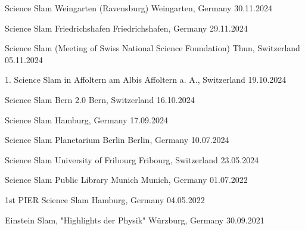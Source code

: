 \begin{cvhonors}

\cvhonor
{Science Slam Weingarten (Ravensburg)} %
{Weingarten, Germany} %
{} %
{30.11.2024} %

\cvhonor
{Science Slam Friedrichshafen} %
{Friedrichshafen, Germany} %
{} %
{29.11.2024} %

\cvhonor
{Science Slam (Meeting of Swiss National Science Foundation)} %
{Thun, Switzerland} %
{} %
{05.11.2024} %

\cvhonor
{1. Science Slam in Affoltern am Albis} %
{Affoltern a. A., Switzerland} %
{} %
{19.10.2024} %

\cvhonor
{Science Slam Bern 2.0} %
{Bern, Switzerland} %
{} %
{16.10.2024} %

\cvhonor
{Science Slam} %
{Hamburg, Germany} %
{} %
{17.09.2024} %

\cvhonor
{Science Slam Planetarium Berlin} %
{Berlin, Germany} %
{} %
{10.07.2024} %
  
\cvhonor
{Science Slam University of Fribourg} %
{Fribourg, Switzerland} %
{} %
{23.05.2024} %

\cvhonor
{Science Slam Public Library Munich} %
{Munich, Germany} %
{} %
{01.07.2022} %

\cvhonor
{1st PIER Science Slam} %
{Hamburg, Germany} %
{} %
{04.05.2022} %

\cvhonor
{Einstein Slam, "Highlights der Physik"} %
{Würzburg, Germany} %
{} %
{30.09.2021} %


\end{cvhonors}
